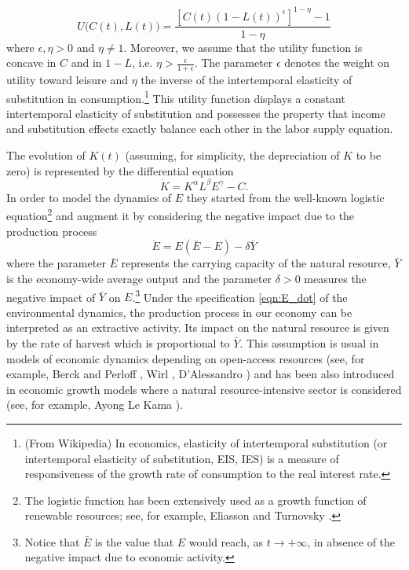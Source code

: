 $$U\Big(C(t), L(t)\Big)=\frac{[C(t)(1-L(t))^{\epsilon}]^{1-\eta} -1}{1-\eta}$$
where $\epsilon,\eta>0$ and $\eta \neq 1$. Moreover, we assume that the utility function is concave in $C$ and in $1-L$, i.e. $\eta > \frac{\epsilon}{1+\epsilon}$. The parameter $\epsilon$ denotes the weight on utility toward leisure and $\eta$ the inverse of the intertemporal elasticity of substitution in consumption.\footnote{(From Wikipedia) In economics, elasticity of intertemporal substitution (or intertemporal elasticity of substitution, EIS, IES) is a measure of responsiveness of the growth rate of consumption to the real interest rate.} This utility function displays a constant intertemporal elasticity of substitution and possesses the property that income and substitution effects exactly balance each other in the labor supply equation. 

The evolution of $K(t)$ (assuming, for simplicity, the depreciation of $K$ to be zero) is represented by the differential equation
\begin{equation} \label{eqn:K_dot}
	\dot{K} = K^\alpha L^\beta E^\gamma -C.
\end{equation}
In order to model the dynamics of $E$ they started from the well-known logistic equation\footnote{The logistic function has been extensively used as a growth function of renewable resources; see, for example, Elìasson and Turnovsky \cite{eliasson_renewable_2004}.} and augment it by considering the negative impact due to the production process
\begin{equation} \label{eqn:E_dot}
	\dot{E} = E(\bar{E}-E)-\delta\bar{Y}
\end{equation}
where the parameter $\bar{E}$ represents the carrying capacity of the natural resource, $\bar{Y}$ is the economy-wide average output and the parameter $\delta>0$ measures the negative impact of $\bar{Y}$ on $E$.\footnote{Notice that $\bar{E}$ is the value that $E$ would reach, as $t\rightarrow +\infty$, in absence of the negative impact due to economic activity.} Under the specification \eqref{eqn:E_dot} of the environmental dynamics, the production process in our economy can be interpreted as an extractive activity. Its impact on the natural resource is given by the rate of harvest which is proportional to $\bar{Y}$. This assumption is usual in models of economic dynamics depending on open-access resources (see, for example, Berck and Perloff \cite{berck_open-access_1984}, Wirl \cite{wirl_cyclical_1995}, D'Alessandro \cite{dalessandro_non-linear_2007}) and has been also introduced in economic growth models where a natural resource-intensive sector is considered (see, for example, Ayong Le Kama \cite{ayong_le_kama_sustainable_2001}).


